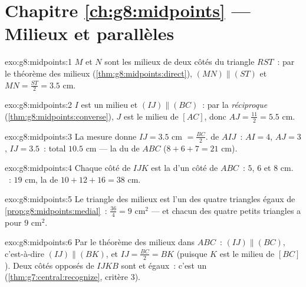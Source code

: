 \section*{Chapitre \ref{ch:g8:midpoints} --- Milieux et parallèles}

\begin{solution}{exo:g8:midpoints:1}
$M$ et $N$ sont les milieux de deux côtés du triangle $RST$~: par le
théorème des milieux (\cref{thm:g8:midpoints:direct}),
$(MN) \parallel (ST)$ et $MN = \frac{ST}{2} = 3.5$ cm.
\end{solution}

\begin{solution}{exo:g8:midpoints:2}
$I$ est un milieu et $(IJ) \parallel (BC)$~: par la
\emph{réciproque} (\cref{thm:g8:midpoints:converse}), $J$ est le
milieu de $[AC]$, donc $AJ = \frac{11}{2} = 5.5$ cm.
\end{solution}

\begin{solution}{exo:g8:midpoints:3}
La mesure donne $IJ = 3.5$ cm $= \frac{BC}{2}$.  de $AIJ$~:
$AI = 4$, $AJ = 3$, $IJ = 3.5$~: total $10.5$ cm --- la  du
 de $ABC$ ($8 + 6 + 7 = 21$ cm).
\end{solution}

\begin{solution}{exo:g8:midpoints:4}
Chaque côté de $IJK$ est la  d'un côté de $ABC$~: $5$, $6$ et
$8$ cm. ~: $19$ cm, la  de $10 + 12 + 16 = 38$ cm.
\end{solution}

\begin{solution}{exo:g8:midpoints:5}
Le triangle des milieux est l'un des quatre triangles égaux de
\cref{prop:g8:midpoints:medial}~:  $\frac{36}{4} = 9$ cm$^2$ ---
et chacun des quatre petits triangles a pour  $9$ cm$^2$.
\end{solution}

\begin{solution}{exo:g8:midpoints:6}
Par le théorème des milieux dans $ABC$~: $(IJ) \parallel (BC)$,
c'est-à-dire $(IJ) \parallel (BK)$, et $IJ = \frac{BC}{2} = BK$
(puisque $K$ est le milieu de $[BC]$). Deux côtés opposés de $IJKB$
sont  et égaux~: c'est un 
(\cref{thm:g7:central:recognize}, critère 3).
\end{solution}

